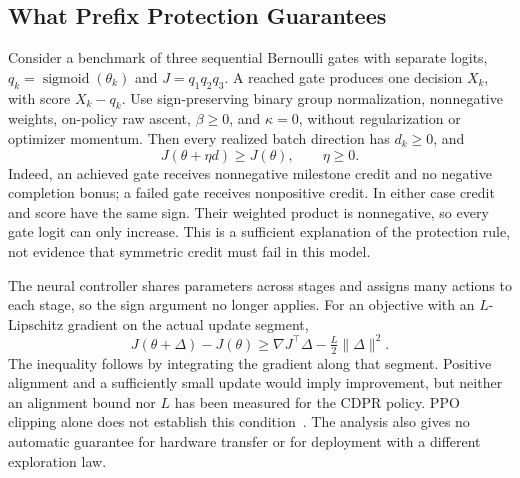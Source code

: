 \subsection{What Prefix Protection Guarantees}
Consider a benchmark of three sequential Bernoulli gates with separate logits, $q_k=\operatorname{sigmoid}(\theta_k)$ and $J=q_1q_2q_3$. A reached gate produces one decision $X_k$, with score $X_k-q_k$. Use sign-preserving binary group normalization, nonnegative weights, on-policy raw ascent, $\beta\ge0$, and $\kappa=0$, without regularization or optimizer momentum. Then every realized batch direction has $d_k\ge0$, and
\begin{equation}
J(\theta+\eta d)\ge J(\theta),\qquad\eta\ge0.
\end{equation}
Indeed, an achieved gate receives nonnegative milestone credit and no negative completion bonus; a failed gate receives nonpositive credit. In either case credit and score have the same sign. Their weighted product is nonnegative, so every gate logit can only increase. This is a sufficient explanation of the protection rule, not evidence that symmetric credit must fail in this model.

The neural controller shares parameters across stages and assigns many actions to each stage, so the sign argument no longer applies. For an objective with an $L$-Lipschitz gradient on the actual update segment,
\begin{equation}
J(\theta+\Delta)-J(\theta)\ge\nabla J^\top\Delta-\tfrac L2\|\Delta\|^2.
\end{equation}
The inequality follows by integrating the gradient along that segment. Positive alignment and a sufficiently small update would imply improvement, but neither an alignment bound nor $L$ has been measured for the CDPR policy. PPO clipping alone does not establish this condition~\cite{trpo}. The analysis also gives no automatic guarantee for hardware transfer or for deployment with a different exploration law.
